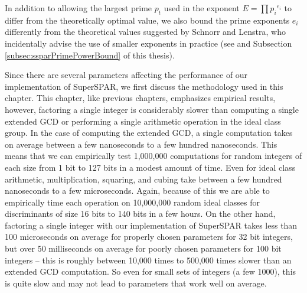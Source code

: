 \documentclass{ucalgthes1}
\theoremstyle{definition}
\begin{document}
In addition to allowing the largest prime $p_t$ used in the exponent $E = \prod {p_i}^{e_i}$ to differ from the theoretically optimal value, we also bound the prime exponents $e_i$ differently from the theoretical values suggested by Schnorr and Lenstra, who incidentally advise the use of smaller exponents in practice (see \cite[p.293]{Schnorr1984} and Subsection \ref{subsec:ssparPrimePowerBound} of this thesis).

Since there are several parameters affecting the performance of our implementation of SuperSPAR, we first discuss the methodology used in this chapter.  This chapter, like previous chapters, emphasizes empirical results, however, factoring a single integer is considerably slower than computing a single extended GCD or performing a single arithmetic operation in the ideal class group.  In the case of computing the extended GCD, a single computation takes on average between a few nanoseconds to a few hundred nanoseconds.  This means that we can empirically test 1,000,000 computations for random integers of each size from 1 bit to 127 bits in a modest amount of time.  Even for ideal class arithmetic, multiplication, squaring, and cubing take between a few hundred nanoseconds to a few microseconds.  Again, because of this we are able to empirically time each operation on 10,000,000 random ideal classes for discriminants of size 16 bits to 140 bits in a few hours.  On the other hand, factoring a single integer with our implementation of SuperSPAR takes less than 100 microseconds on average for properly chosen parameters for 32 bit integers, but over 50 milliseconds on average for poorly chosen parameters for 100 bit integers -- this is roughly between 10,000 times to 500,000 times slower than an extended GCD computation.  So even for small sets of integers (a few 1000), this is quite slow and may not lead to parameters that work well on average.
\end{document}
